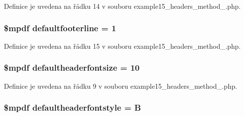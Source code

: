 Definice je uvedena na řádku 14 v souboru example15\-\_\-headers\-\_\-method\-\_.\-php.

\hypertarget{example15__headers__method__1_8php_aeb1097aa7f38066f868a9c71ded9e510}{
\subsubsection[{defaultfooterline}]{\setlength{\rightskip}{0pt plus 5cm}\$mpdf defaultfooterline = 1}}\label{example15__headers__method__1_8php_aeb1097aa7f38066f868a9c71ded9e510}


Definice je uvedena na řádku 15 v souboru example15\-\_\-headers\-\_\-method\-\_.\-php.

\hypertarget{example15__headers__method__1_8php_a4c43cebc1c86e1ef09a48264604a6fb2}{
\subsubsection[{defaultheaderfontsize}]{\setlength{\rightskip}{0pt plus 5cm}\$mpdf defaultheaderfontsize = 10}}\label{example15__headers__method__1_8php_a4c43cebc1c86e1ef09a48264604a6fb2}


Definice je uvedena na řádku 9 v souboru example15\-\_\-headers\-\_\-method\-\_.\-php.

\hypertarget{example15__headers__method__1_8php_ac532ed43fd458154e30602256ee55dff}{
\subsubsection[{defaultheaderfontstyle}]{\setlength{\rightskip}{0pt plus 5cm}\$mpdf defaultheaderfontstyle = B}}\label{example15__headers__method__1_8php_ac532ed43fd458154e30602256ee55dff}


